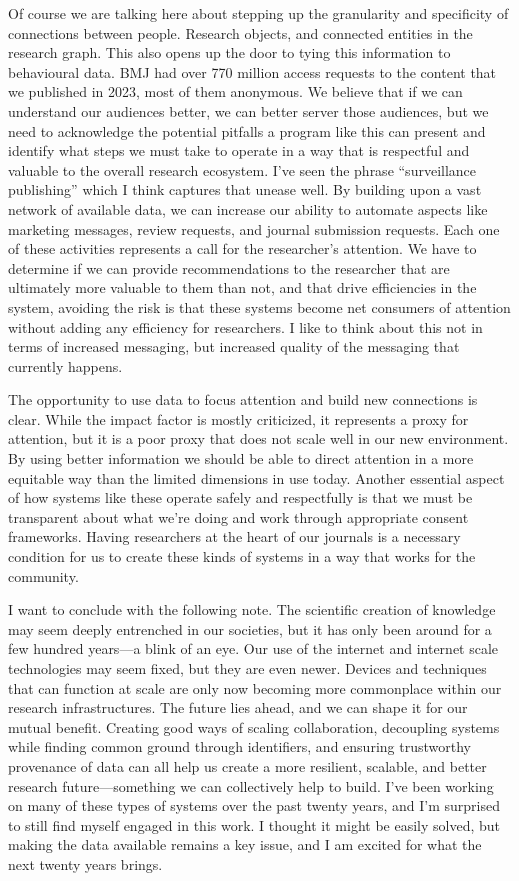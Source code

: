 \documentclass[]{hdsr}
\begin{document}
Of course we are talking here about stepping up the granularity and specificity of connections between people. Research objects, and connected entities in the research graph. This also opens up the door to tying this information to behavioural data. BMJ had over 770 million access requests to the content that we published in 2023, most of them anonymous. We believe that if we can understand our audiences better, we can better server those audiences, but we need to acknowledge the potential pitfalls a program like this can present and identify what steps we must take to operate in a way that is respectful and valuable to the overall research ecosystem. I’ve seen the phrase “surveillance publishing” which I think captures that unease well. By building upon a vast network of available data, we can increase our ability to automate aspects like marketing messages, review requests, and journal submission requests. Each one of these activities represents a call for the researcher's attention. We have to determine if we can provide recommendations to the researcher that are ultimately more valuable to them than not, and that drive efficiencies in the system, avoiding the risk is that these systems become net consumers of attention without adding any efficiency for researchers. I like to think about this not in terms of increased messaging, but increased quality of the messaging that currently happens.

The opportunity to use data to focus attention and build new connections is clear. While the impact factor is mostly criticized, it represents a proxy for attention, but it is a poor proxy that does not scale well in our new environment. By using better information we should be able to direct attention in a more equitable way than the limited dimensions in use today. Another essential aspect of how systems like these operate safely and respectfully is that we must be transparent about what we're doing and work through appropriate consent frameworks. Having researchers at the heart of our journals is a necessary condition for us to create these kinds of systems in a way that works for the community.

I want to conclude with the following note. The scientific creation of knowledge may seem deeply entrenched in our societies, but it has only been around for a few hundred years—a blink of an eye. Our use of the internet and internet scale technologies may seem fixed, but they are even newer. Devices and techniques that can function at scale are only now becoming more commonplace within our research infrastructures. The future lies ahead, and we can shape it for our mutual benefit. Creating good ways of scaling collaboration, decoupling systems while finding common ground through identifiers, and ensuring trustworthy provenance of data can all help us create a more resilient, scalable, and better research future—something we can collectively help to build. I've been working on many of these types of systems over the past twenty years, and I'm surprised to still find myself engaged in this work. I thought it might be easily solved, but making the data available remains a key issue, and I am excited for what the next twenty years brings.
\end{document}
